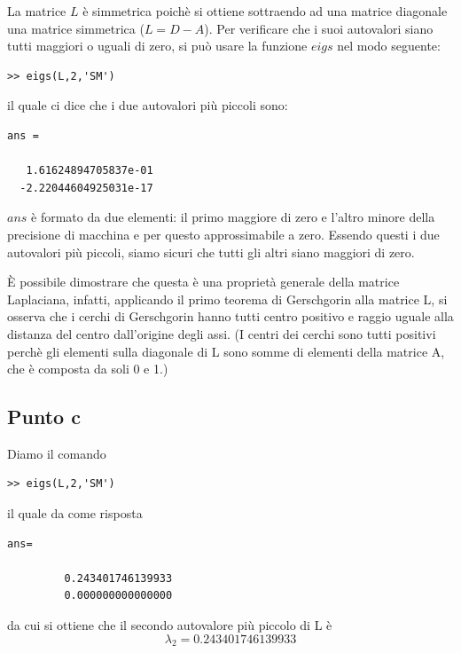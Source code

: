\documentclass[11pt,a4paper,twoside,openright,titlepage,
                           headinclude,footinclude,BCOR5mm,
                           numbers=noenddot,cleardoublepage=empty,
                           tablecaptionabove]{scrbook}
\begin{document}
La matrice $L$ è simmetrica poichè si ottiene sottraendo ad una matrice diagonale una matrice simmetrica ($L=D-A$).
Per verificare che i suoi autovalori siano tutti maggiori o uguali di zero, si può usare la funzione $eigs$ nel modo seguente:
\begin{lstlisting}[frame=lines]
>> eigs(L,2,'SM')
\end{lstlisting}
il quale ci dice che i due autovalori più piccoli sono: 
\begin{lstlisting}[frame=lines]
ans =

   1.61624894705837e-01
  -2.22044604925031e-17

\end{lstlisting}
$ans$ è formato da due elementi: il primo maggiore di zero e l'altro minore della precisione di macchina e per questo approssimabile a zero.
Essendo questi i due autovalori più piccoli, siamo sicuri che tutti gli altri siano maggiori di zero.
\par
È possibile dimostrare che questa è una proprietà generale della matrice Laplaciana, infatti, applicando il primo teorema di Gerschgorin alla matrice L, si osserva che i cerchi di Gerschgorin hanno tutti centro positivo e raggio uguale alla distanza del centro dall'origine degli assi. (I centri dei cerchi sono tutti positivi perchè gli elementi sulla diagonale di L sono somme di elementi della matrice A, che è composta da soli 0 e 1.)

\subsection{\textbf{Punto c}}

Diamo il comando
\begin{lstlisting}[frame=lines]
>> eigs(L,2,'SM')
\end{lstlisting}
il quale da come risposta
\begin{lstlisting}[frame=lines]
ans=

         0.243401746139933
         0.000000000000000
\end{lstlisting}
da cui si ottiene che il secondo autovalore più piccolo di L è 
\[
\lambda_{2}=0.243401746139933
\]
\end{document}
